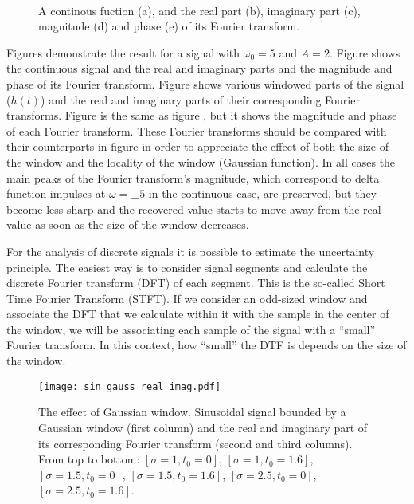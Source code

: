 \begin{figure}
\centering
{}%
\\%
\hspace{0.33\textwidth}
\caption{A continous fuction (a), and the real part (b), imaginary part (c), magnitude (d) and phase (e) of its Fourier transform.}\label{fig:sin_signal_fourier_comp}
\end{figure}

Figures demonstrate the result for a signal with $\omega_0=5$ and $A=2$. Figure  shows the continuous signal and  the real and imaginary parts and the magnitude and phase of its Fourier transform.  Figure  shows various windowed parts of the signal ($h(t)$) and the real and imaginary parts of their corresponding Fourier transforms.  Figure is the same as figure , but it shows the magnitude and phase of each Fourier transform. These Fourier transforms should be compared with their counterparts in figure  in order to appreciate the effect of both the size of the window and the locality of the window (Gaussian function). In all cases the main peaks of the Fourier transform's magnitude, which correspond to delta function impulses at $\omega=\pm 5$ in the continuous case, are preserved, but they become less sharp and the recovered value starts to move away from the real value as soon as the size of the window decreases. 

For the analysis of discrete signals it is possible to estimate the uncertainty principle. The easiest way is to consider signal segments and calculate the discrete Fourier transform (DFT) of each segment. This is the so-called Short Time Fourier Transform (STFT). If we consider an odd-sized window and associate the DFT that we calculate within it with the sample in the center of the window, we will be associating each sample of the signal with a ``small'' Fourier transform. In this context, how ``small'' the DTF is depends on the size of the window.



\begin{figure}
\centering
\texttt{[image: sin\_gauss\_real\_imag.pdf]}
\caption{The effect of Gaussian window. Sinusoidal signal bounded by a Gaussian window (first column) and the real and imaginary part of its corresponding Fourier transform (second and third columns). From top to bottom: $[\sigma=1, t_0=0]$, $[\sigma=1, t_0=1.6]$, $[\sigma=1.5, t_0=0]$, $[\sigma=1.5, t_0=1.6]$, $[\sigma=2.5, t_0=0]$, $[\sigma=2.5, t_0=1.6]$.}\label{fig:gaussian_window_real_imag}
\end{figure}

